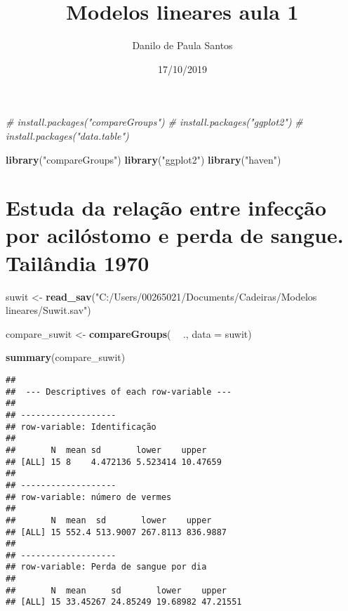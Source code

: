 \documentclass[]{article}
\title{Modelos lineares aula 1}
\author{Danilo de Paula Santos}
\date{17/10/2019}
\newenvironment{Shaded}{\begin{snugshade}}{\end{snugshade}}
\newcommand{\CommentTok}[1]{\textcolor[rgb]{0.56,0.35,0.01}{\textit{#1}}}
\newcommand{\DataTypeTok}[1]{\textcolor[rgb]{0.13,0.29,0.53}{#1}}
\newcommand{\KeywordTok}[1]{\textcolor[rgb]{0.13,0.29,0.53}{\textbf{#1}}}
\newcommand{\NormalTok}[1]{#1}
\newcommand{\OperatorTok}[1]{\textcolor[rgb]{0.81,0.36,0.00}{\textbf{#1}}}
\newcommand{\StringTok}[1]{\textcolor[rgb]{0.31,0.60,0.02}{#1}}
\begin{document}
\maketitle

\begin{Shaded}
\begin{Highlighting}[]
\CommentTok{# install.packages("compareGroups")}
\CommentTok{# install.packages("ggplot2")}
\CommentTok{# install.packages("data.table")}


\KeywordTok{library}\NormalTok{(}\StringTok{"compareGroups"}\NormalTok{)}
\KeywordTok{library}\NormalTok{(}\StringTok{"ggplot2"}\NormalTok{)}
\KeywordTok{library}\NormalTok{(}\StringTok{"haven"}\NormalTok{)}
\end{Highlighting}
\end{Shaded}

\hypertarget{estuda-da-relacao-entre-infeccao-por-acilostomo-e-perda-de-sangue.-tailandia-1970}{%
\section{Estuda da relação entre infecção por acilóstomo e perda de
sangue. Tailândia
1970}\label{estuda-da-relacao-entre-infeccao-por-acilostomo-e-perda-de-sangue.-tailandia-1970}}

\begin{Shaded}
\begin{Highlighting}[]
\NormalTok{suwit <-}\StringTok{ }\KeywordTok{read_sav}\NormalTok{(}\StringTok{"C:/Users/00265021/Documents/Cadeiras/Modelos lineares/Suwit.sav"}\NormalTok{)}
\end{Highlighting}
\end{Shaded}

\begin{Shaded}
\begin{Highlighting}[]
\NormalTok{compare_suwit <-}\StringTok{ }\KeywordTok{compareGroups}\NormalTok{( }\OperatorTok{~}\StringTok{ }\NormalTok{., }\DataTypeTok{data =}\NormalTok{ suwit)}

\KeywordTok{summary}\NormalTok{(compare_suwit)}
\end{Highlighting}
\end{Shaded}

\begin{verbatim}
## 
##  --- Descriptives of each row-variable ---
## 
## ------------------- 
## row-variable: Identificação 
## 
##       N  mean sd       lower    upper   
## [ALL] 15 8    4.472136 5.523414 10.47659
## 
## ------------------- 
## row-variable: número de vermes 
## 
##       N  mean  sd       lower    upper   
## [ALL] 15 552.4 513.9007 267.8113 836.9887
## 
## ------------------- 
## row-variable: Perda de sangue por dia 
## 
##       N  mean     sd       lower    upper   
## [ALL] 15 33.45267 24.85249 19.68982 47.21551
\end{verbatim}
\end{document}
